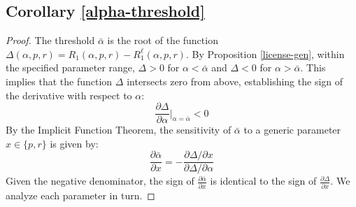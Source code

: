 \documentclass[11pt]{article}
\theoremstyle{plain}
\theoremstyle{definition}
\theoremstyle{plain}
\theoremstyle{plain}
\theoremstyle{plain}
\theoremstyle{plain}
\numberwithin{equation}{section}
\begin{document}
\subsection*{Corollary \ref{alpha-threshold}}
\begin{proof}
    The threshold $\bar{\alpha}$ is the root of the function $\Delta(\alpha, p, r) = R_1(\alpha, p, r) - R_1^\ell(\alpha, p, r)$.
    By Proposition \ref{license-gen}, within the specified parameter range, $\Delta > 0$ for $\alpha < \bar{\alpha}$ and $\Delta < 0$ for $\alpha > \bar{\alpha}$. This implies that the function $\Delta$ intersects zero from above, establishing the sign of the derivative with respect to $\alpha$:
    \begin{equation*}
        \frac{\partial \Delta}{\partial \alpha} \bigg|_{\alpha = \bar{\alpha}} < 0
    \end{equation*}
    By the Implicit Function Theorem, the sensitivity of $\bar{\alpha}$ to a generic parameter $x \in \{p, r\}$ is given by:
    \begin{equation*}
        \frac{\partial \bar{\alpha}}{\partial x} = - \frac{\partial \Delta / \partial x}{\partial \Delta / \partial \alpha}
    \end{equation*}
    Given the negative denominator, the sign of $\frac{\partial \bar{\alpha}}{\partial x}$ is identical to the sign of $\frac{\partial \Delta}{\partial x}$. We analyze each parameter in turn.


\end{proof}
\end{document}
